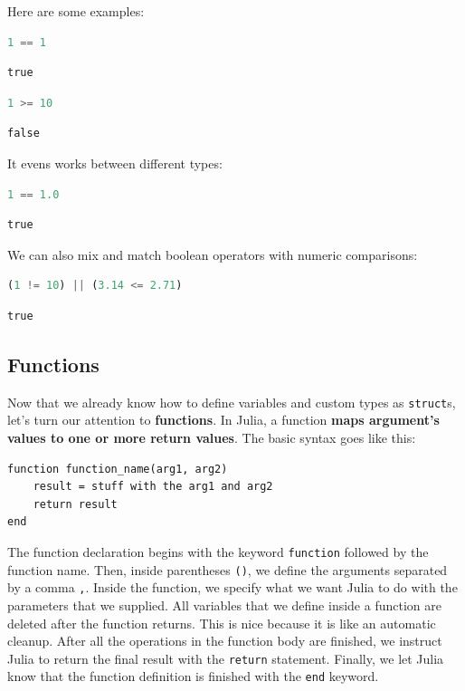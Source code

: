 \documentclass[
  notoc %
]{tufte-book}
\newcommand{\passthrough}[1]{#1}
\begin{document}
Here are some examples:

\begin{lstlisting}[language=Julia]
1 == 1
\end{lstlisting}

\begin{lstlisting}[language=Output]
true
\end{lstlisting}

\begin{lstlisting}[language=Julia]
1 >= 10
\end{lstlisting}

\begin{lstlisting}[language=Output]
false
\end{lstlisting}

It evens works between different types:

\begin{lstlisting}[language=Julia]
1 == 1.0
\end{lstlisting}

\begin{lstlisting}[language=Output]
true
\end{lstlisting}

We can also mix and match boolean operators with numeric comparisons:

\begin{lstlisting}[language=Julia]
(1 != 10) || (3.14 <= 2.71)
\end{lstlisting}

\begin{lstlisting}[language=Output]
true
\end{lstlisting}

\hypertarget{sec:function}{%
\subsection{Functions}\label{sec:function}}

Now that we already know how to define variables and custom types as
\passthrough{\lstinline!struct!}s, let's turn our attention to
\textbf{functions}. In Julia, a function \textbf{maps argument's values
to one or more return values}. The basic syntax goes like this:

\begin{lstlisting}
function function_name(arg1, arg2)
    result = stuff with the arg1 and arg2
    return result
end
\end{lstlisting}

The function declaration begins with the keyword
\passthrough{\lstinline!function!} followed by the function name. Then,
inside parentheses \passthrough{\lstinline!()!}, we define the arguments
separated by a comma \passthrough{\lstinline!,!}. Inside the function,
we specify what we want Julia to do with the parameters that we
supplied. All variables that we define inside a function are deleted
after the function returns. This is nice because it is like an automatic
cleanup. After all the operations in the function body are finished, we
instruct Julia to return the final result with the
\passthrough{\lstinline!return!} statement. Finally, we let Julia know
that the function definition is finished with the
\passthrough{\lstinline!end!} keyword.
\end{document}
